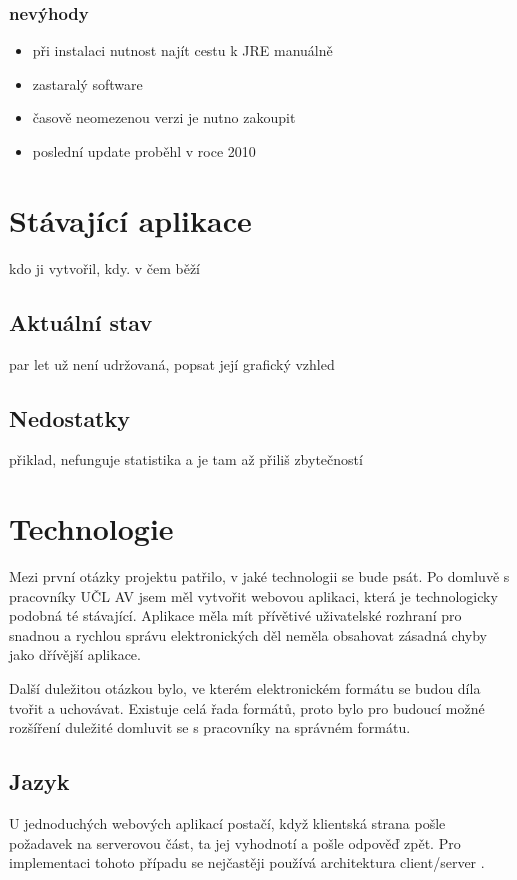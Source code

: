             \subsubsection{nevýhody}
                \begin{itemize}
                    \item při instalaci nutnost najít cestu k JRE manuálně
                    \item zastaralý software
                    \item časově neomezenou verzi je nutno zakoupit
                    \item poslední update proběhl v roce 2010
                \end{itemize}
                
    \section{Stávající aplikace}
        kdo ji vytvořil, kdy. v čem běží
        
        \subsection{Aktuální stav}
            par let už není udržovaná, popsat její grafický vzhled
            
        \subsection{Nedostatky}
            přiklad, nefunguje statistika a je tam až přiliš zbytečností
            
    \section{Technologie}
        Mezi první otázky projektu patřilo, v jaké technologii se bude psát. Po domluvě s pracovníky UČL AV jsem měl vytvořit webovou aplikaci, která je technologicky podobná té stávající. Aplikace měla mít přívětivé uživatelské rozhraní pro snadnou a rychlou správu elektronických děl neměla obsahovat zásadná chyby jako dřívější aplikace. 
        
        Další duležitou otázkou bylo, ve kterém elektronickém formátu se budou díla tvořit a uchovávat. Existuje celá řada formátů, proto bylo pro budoucí možné rozšíření duležité domluvit se s pracovníky na správném formátu.
        
        \subsection{Jazyk}
            U jednoduchých webových aplikací postačí, když klientská strana pošle požadavek na serverovou část, ta jej vyhodnotí a pošle odpověď zpět. Pro implementaci tohoto případu se nejčastěji používá architektura client/server \cite{languages}. 
            
